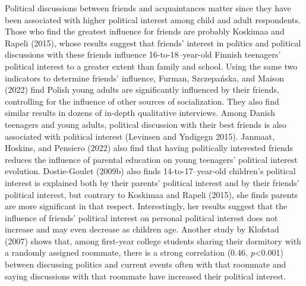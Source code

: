 \documentclass[
  letterpaper,
  DIV=11,
  numbers=noendperiod]{scrreprt}
\begin{document}
Political discussions between friends and acquaintances matter since
they have been associated with higher political interest among child and
adult respondents. Those who find the greatest influence for friends are
probably Koskimaa and Rapeli (2015), whose results suggest that friends'
interest in politics and political discussions with these friends
influence 16-to-18--year-old Finnish teenagers' political interest to a
greater extent than family and school. Using the same two indicators to
determine friends' influence, Furman, Szczepańska, and Maison (2022)
find Polish young adults are significantly influenced by their friends,
controlling for the influence of other sources of socialization. They
also find similar results in dozens of in-depth qualitative interviews.
Among Danish teenagers and young adults, political discussion with their
best friends is also associated with political interest (Levinsen and
Yndigegn 2015). Janmaat, Hoskins, and Pensiero (2022) also find that
having politically interested friends reduces the influence of parental
education on young teenagers' political interest evolution.
Dostie-Goulet (2009b) also finds 14-to-17--year-old children's political
interest is explained both by their parents' political interest and by
their friends' political interest, but contrary to Koskimaa and Rapeli
(2015), she finds parents are more significant in that respect.
Interestingly, her results suggest that the influence of friends'
political interest on personal political interest does not increase and
may even decrease as children age. Another study by Klofstad (2007)
shows that, among first-year college students sharing their dormitory
with a randomly assigned roommate, there is a strong correlation (0.46,
\emph{p}\textless0.001) between discussing politics and current events
often with that roommate and saying discussions with that roommate have
increased their political interest.
\end{document}
